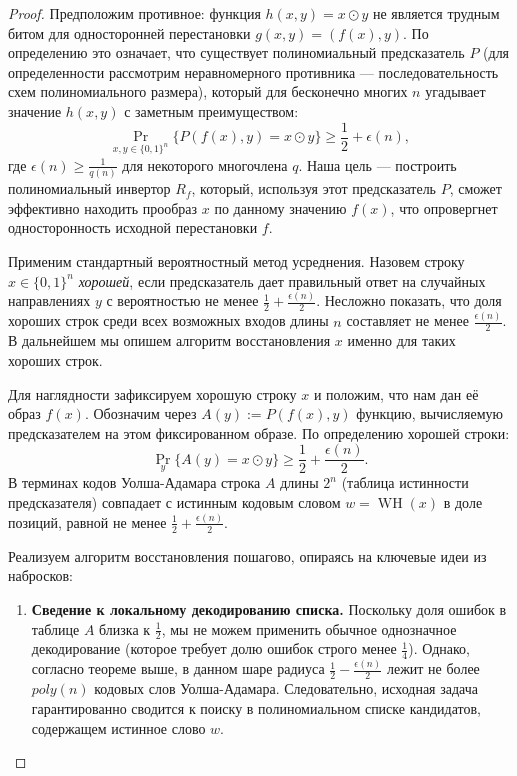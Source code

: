 \begin{proof}
    Предположим противное: функция $h(x, y) = x \odot y$ не является трудным битом для односторонней перестановки $g(x, y) = (f(x), y)$. По определению это означает, что существует полиномиальный предсказатель $P$ (для определенности рассмотрим неравномерного противника — последовательность схем полиномиального размера), который для бесконечно многих $n$ угадывает значение $h(x,y)$ с заметным преимуществом:
    \[ \Pr_{x, y \in \{0, 1\}^n} \{P(f(x), y) = x \odot y\} \ge \frac{1}{2} + \epsilon(n), \]
    где $\epsilon(n) \ge \frac{1}{q(n)}$ для некоторого многочлена $q$. Наша цель — построить полиномиальный инвертор $R_f$, который, используя этот предсказатель $P$, сможет эффективно находить прообраз $x$ по данному значению $f(x)$, что опровергнет односторонность исходной перестановки $f$.

    Применим стандартный вероятностный метод усреднения. Назовем строку $x \in \{0,1\}^n$ \textit{хорошей}, если предсказатель дает правильный ответ на случайных направлениях $y$ с вероятностью не менее $\frac{1}{2} + \frac{\epsilon(n)}{2}$. Несложно показать, что доля хороших строк среди всех возможных входов длины $n$ составляет не менее $\frac{\epsilon(n)}{2}$. В дальнейшем мы опишем алгоритм восстановления $x$ именно для таких хороших строк.

    Для наглядности зафиксируем хорошую строку $x$ и положим, что нам дан её образ $f(x)$. Обозначим через $A(y) := P(f(x), y)$ функцию, вычисляемую предсказателем на этом фиксированном образе. По определению хорошей строки:
    \[ \Pr_{y} \{A(y) = x \odot y\} \ge \frac{1}{2} + \frac{\epsilon(n)}{2}. \]
    В терминах кодов Уолша-Адамара строка $A$ длины $2^n$ (таблица истинности предсказателя) совпадает с истинным кодовым словом $w = \operatorname{WH}(x)$ в доле позиций, равной не менее $\frac{1}{2} + \frac{\epsilon(n)}{2}$. 
    
    Реализуем алгоритм восстановления пошагово, опираясь на ключевые идеи из набросков:

    \begin{enumerate}
        \item \textbf{Сведение к локальному декодированию списка.} Поскольку доля ошибок в таблице $A$ близка к $\frac{1}{2}$, мы не можем применить обычное однозначное декодирование (которое требует долю ошибок строго менее $\frac{1}{4}$). Однако, согласно теореме выше, в данном шаре радиуса $\frac{1}{2} - \frac{\epsilon(n)}{2}$ лежит не более $poly(n)$ кодовых слов Уолша-Адамара. Следовательно, исходная задача гарантированно сводится к поиску в полиномиальном списке кандидатов, содержащем истинное слово $w$.


\end{enumerate}
\end{proof}
